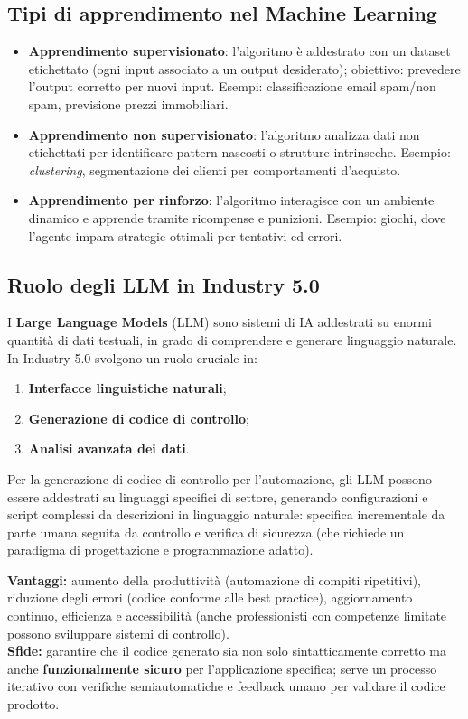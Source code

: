 \subsection{Tipi di apprendimento nel Machine Learning}
\begin{itemize}
    \item \textbf{Apprendimento supervisionato}: l'algoritmo è addestrato con un dataset etichettato (ogni input associato a un output desiderato); obiettivo: prevedere l'output corretto per nuovi input. Esempi: classificazione email spam/non spam, previsione prezzi immobiliari.
    \item \textbf{Apprendimento non supervisionato}: l'algoritmo analizza dati non etichettati per identificare pattern nascosti o strutture intrinseche. Esempio: \emph{clustering}, segmentazione dei clienti per comportamenti d'acquisto.
    \item \textbf{Apprendimento per rinforzo}: l'algoritmo interagisce con un ambiente dinamico e apprende tramite ricompense e punizioni. Esempio: giochi, dove l'agente impara strategie ottimali per tentativi ed errori.
\end{itemize}

\subsection{Ruolo degli LLM in Industry 5.0}
I \textbf{Large Language Models} (LLM) sono sistemi di IA addestrati su enormi quantità di dati testuali, in grado di comprendere e generare linguaggio naturale. In Industry 5.0 svolgono un ruolo cruciale in:
\begin{enumerate}
    \item \textbf{Interfacce linguistiche naturali};
    \item \textbf{Generazione di codice di controllo};
    \item \textbf{Analisi avanzata dei dati}.
\end{enumerate}

Per la generazione di codice di controllo per l'automazione, gli LLM possono essere addestrati su linguaggi specifici di settore, generando configurazioni e script complessi da descrizioni in linguaggio naturale: specifica incrementale da parte umana seguita da controllo e verifica di sicurezza (che richiede un paradigma di progettazione e programmazione adatto).

\begin{note}
\textbf{Vantaggi:} aumento della produttività (automazione di compiti ripetitivi), riduzione degli errori (codice conforme alle best practice), aggiornamento continuo, efficienza e accessibilità (anche professionisti con competenze limitate possono sviluppare sistemi di controllo).\\
\textbf{Sfide:} garantire che il codice generato sia non solo sintatticamente corretto ma anche \textbf{funzionalmente sicuro} per l'applicazione specifica; serve un processo iterativo con verifiche semiautomatiche e feedback umano per validare il codice prodotto.
\end{note}

